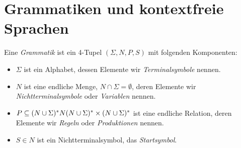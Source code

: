 \section{Grammatiken und kontextfreie Sprachen}

\newcommand{\chz}{CH0}
\newcommand{\cho}{CH1}
\newcommand{\cht}{CH2}
\newcommand{\chr}{CH3}

\begin{Def}
	Eine \emph{Grammatik} ist ein 4-Tupel $(\Sigma,N,P,S)$ mit folgenden Komponenten:
	\begin{itemize}
	\item $\Sigma$ ist ein Alphabet, dessen Elemente wir \emph{Terminalsymbole} nennen.
	\item $N$ ist eine endliche Menge, $N\cap\Sigma = \emptyset$, deren Elemente wir \emph{Nichtterminalsymbole} oder \emph{Variablen} nennen. 
	\item $P\subseteq (N\cup\Sigma)^*N(N\cup\Sigma)^* \times (N\cup\Sigma)^*$ ist eine endliche Relation, 
	deren Elemente wir \emph{Regeln} oder \emph{Produktionen} nennen.
	\item $S\in N$ ist ein Nichtterminalsymbol, das \emph{Startsymbol}.
	\qedhere
	\end{itemize}
\end{Def}

